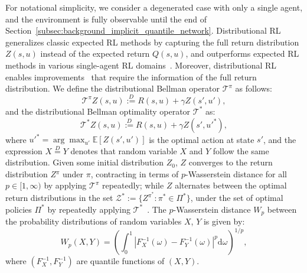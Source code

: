 \documentclass{article}
\newcommand{\state}{s}
\newcommand{\action}{u}
\newcommand{\rewardfunction}{R}
\newcommand{\utilityexp}{Q}
\newcommand{\utility}{Z}
\newcommand{\quantile}{\omega}
\newcommand{\inversecdf}{F^{-1}}
\begin{document}
For notational simplicity, we consider a degenerated case with only a single agent, and the environment is fully observable until the end of Section~\ref{subsec:background_implicit_quantile_network}. Distributional RL generalizes classic expected RL methods by capturing the full return distribution $\utility{}(\state{},\action{})$ instead of the expected return $\utilityexp{}(\state{},\action{})$, and outperforms expected RL methods in various single-agent RL domains~\cite{Bellemare2017C51,Bellemare2019S51,Dabney2018QR-DQN,Dabney2018IQN,Rowland2019ER-DQN,Yang2019FQF}. Moreover, distributional RL enables improvements~\cite{Nikolov2019IDS,Zhang2019QUOTA,Mavrin2019DLTV} that require the information of the full return distribution. We define the distributional Bellman operator $\mathcal{T}^\pi$ as follows:
\begin{equation}
\mathcal{T}^\pi \utility{}(\state{},\action{})\stackrel{D}{:=}\rewardfunction{}(\state{},\action{})+\gamma \utility{}(\state{}',\action{}'),
\end{equation}
and the distributional Bellman optimality operator $\mathcal{T}^*$ as:
\begin{equation}
\mathcal{T}^* \utility{}(\state{},\action{})\stackrel{D}{:=}\rewardfunction{}(\state{},\action{})+\gamma \utility{}(\state{}',\action{}'^*),
\end{equation}
where $\action{}'^*=\arg\max_{\action'}\mathbb{E}[\utility{}(\state{}',\action')]$ is the optimal action at state $\state{}'$, and the expression $X\stackrel{D}{=}Y$ denotes that random variable $X$ and $Y$ follow the same distribution. Given some initial distribution $Z_0$, $\utility{}$ converges to the return distribution $\utility{}^\pi$ under $\pi$, contracting in terms of $p$-Wasserstein distance for all $p\in[1,\infty)$ by applying $\mathcal{T}^\pi$ repeatedly; while $\utility{}$ alternates between the optimal return distributions in the set $\mathcal{\utility{}}^*:=\{\utility^{\pi^*}:\pi^*\in\Pi^*\}$, under the set of optimal policies $\Pi^*$ by repeatedly applying $\mathcal{T}^*$~\cite{Bellemare2017C51}. The $p$-Wasserstein distance $W_p$ between the probability distributions of random variables $X$, $Y$ is given by:
\begin{equation}
W_p(X,Y)=\left(\int_0^1|\inversecdf_X(\quantile)-\inversecdf_Y(\quantile)|^p \mathrm{d}\quantile\right)^{1/p},
\end{equation}
where $(\inversecdf_X,\inversecdf_Y)$ are quantile functions of $(X,Y)$.
\end{document}
